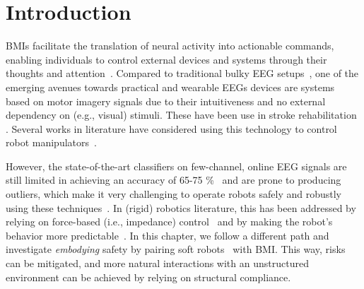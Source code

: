\section{Introduction}
\glspl{BMI} \cite{liu2024cognitive} facilitate the translation of neural activity into actionable commands, enabling individuals to control external devices and systems through their thoughts and attention~\cite{coyle2007brain,lee2017brain}. Compared to traditional bulky EEG setups~\cite{van2012brain}, one of the emerging avenues towards practical and wearable \glspl{EEG} devices are systems based on motor imagery signals due to their intuitiveness and no external dependency on (e.g., visual) stimuli. These have been use in stroke rehabilitation \cite{khan2020review}. Several works in literature have considered using this technology to control robot manipulators~\cite{schiatti2017soft,aldini2019effect,lee2024noir}. %

However, the state-of-the-art classifiers on few-channel, online \gls{EEG} signals are still limited in achieving an accuracy of 65-75 \si{\percent}~\cite{arpaia2022non, lee2024noir} and are prone to producing outliers, which make it very challenging to operate robots safely and robustly using these techniques~\cite{liu2024cognitive}. In (rigid) robotics literature, this has been addressed by relying on force-based (i.e., impedance) control~\cite{schiatti2017soft} and by making the robot's behavior more predictable~\cite{aldini2019effect}.
%
%
In this chapter, we follow a different path and investigate \textit{embodying} safety by pairing soft robots~\cite{rus2015design, della2020softencyclopedia} 
with \gls{BMI}. This way, risks can be mitigated, and more natural interactions with an unstructured environment can be achieved by relying on structural compliance.

